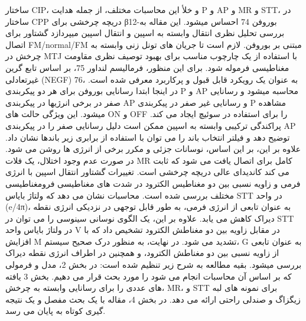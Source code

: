 ساختار CIP، و خلأ این محاسبات مختلف، از جمله هدایت P و AP و MR و STT، در ساختار CPP دریچه چرخشی برای β12-بوروفن 74 احساس میشود. این مقاله به بررسی تحلیل نظری انتقال وابسته به اسپین و انتقال اسپین میپردازد گشتاور برای اتصال FM/normal/FM مبتنی بر بوروفن. لازم است تا جریان های تونل زنی وابسته به چرخش در MTJ با استفاده از یک چارچوب مناسب برای بهبود توصیف نظری مقاومت مغناطیسی فرموله شود. برای این منظور، فرمالیسم لنداور 75، بر اساس تابع گرین غیرتعادلی (NEGF) 76، به عنوان یک رویکرد قابل قبول و پرکاربرد معرفی شده است. در اینجا ابتدا رسانایی بوروفن برای هر دو پیکربندی P و AP محاسبه میشود و رسانایی صفر در برخی انرژیها در پیکربندی AP و رسانایی غیر صفر در پیکربندی P مشاهده میشود. این ویژگی حالت های ON و OFF را برای استفاده در سوئیچ ایجاد می کند. پراکندگی ترکیبی وابسته به اسپین ممکن است دلیل رسانایی صفر را در پیکربندی AP توضیح دهد و فیلتر انتخاب باند را می توان با استفاده از برابری زیر باندها نشان داد. علاوه بر این، بر این اساس، نوسانات جزئی و مکرر برخی از انرژی ها روشن می شود. در صورت عدم وجود اختلال، یک فلات MR کامل برای اتصال یافت می شود که ثابت می کند کاندیدای عالی دریچه چرخشی است. تغییرات گشتاور انتقال اسپین با انرژی فرمی و زاویه نسبی بین دو مغناطیس الکترود در شدت های مغناطیسی فرومغناطیسی مختلف بررسی شده است. محاسبات نشان می دهد که ولتاژ بایاس STT در واحد (e/4π)، به عنوان تابعی از انرژی فرمی، به طور قابل توجهی در نزدیکی انرژی نقطه دیراک کاهش می یابد. علاوه بر این، یک الگوی نوسانی سینوسی را می توان در STT در ولتاژ بایاس واحد V در مقابل زاویه بین دو مغناطش الکترود تشخیص داد که با افزایش M تشدید می شود. در نهایت، به منظور درک صحیح سیستم، G به عنوان تابعی از زاویه نسبی بین دو مغناطش الکترود، و همچنین در اطراف انرژی نقطه دیراک بررسی میشود. بقیه مطالعه به شرح زیر تنظیم شده است: در بخش 2، مدل و فرمولی که بر اساس آن محاسبات انجام می شود را مورد بحث قرار می دهیم. بخش 3 یافته های عددی را برای رسانایی وابسته به چرخش، MR، و STT برای نمونه های لبه زیگزاگ و صندلی راحتی ارائه می دهد. در بخش 4، مقاله با یک بحث مفصل و یک نتیجه گیری کوتاه به پایان می رسد.

